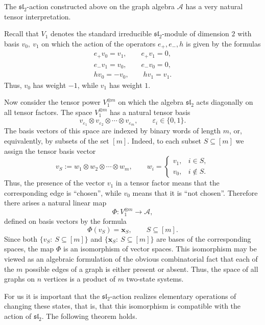 \documentclass[12pt,reqno]{amsart}
\begin{document}
The $\mathfrak{sl}_2$-action constructed above on the graph algebra
$\mathcal A$ has a very natural tensor interpretation.

Recall that $V_1$ denotes the standard irreducible $\mathfrak{sl}_2$-module
of dimension $2$ with basis
$
v_0,\ v_1
$
on which the action of the operators $e_+,e_-,h$ is given by the formulas
\begin{equation}\label{V1_action}
\begin{gathered}
e_+v_0=v_1,\qquad e_+v_1=0,\\
e_-v_1=v_0,\qquad e_-v_0=0,
\\
hv_0=-v_0,\qquad hv_1=v_1.
\end{gathered}
\end{equation}
Thus, $v_0$ has weight $-1$, while $v_1$ has weight $1$.

Now consider the tensor power
$
V_1^{\otimes m}
$
on which the algebra $\mathfrak{sl}_2$ acts diagonally on all tensor factors.
The space $V_1^{\otimes m}$ has a natural tensor basis
$$
v_{\varepsilon_1}\otimes v_{\varepsilon_2}\otimes\cdots\otimes v_{\varepsilon_m},
\qquad
\varepsilon_i\in\{0,1\}.
$$
The basis vectors of this space are indexed by binary words of length $m$,
or, equivalently, by subsets of the set $[m]$.
Indeed, to each subset $S\subseteq[m]$ we assign the tensor basis vector
\begin{equation}\label{ tensor_basis_S}
v_S:=w_1\otimes w_2\otimes\cdots\otimes w_m,
\qquad
w_i=
\begin{cases}
v_1,& i\in S,\\
v_0,& i\notin S.
\end{cases}
\end{equation}
Thus, the presence of the vector $v_1$ in a tensor factor means that the
corresponding edge is ``chosen'', while $v_0$ means that it is ``not chosen''.
Therefore there arises a natural linear map
$$
\Phi:V_1^{\otimes m}\longrightarrow \mathcal A,
$$
defined on basis vectors by the formula
$$
\Phi(v_S)=\boldsymbol{x}_S,
\qquad
S\subseteq[m].
$$
Since both $\{v_S:\ S\subseteq[m]\}$ and
$\{\boldsymbol{x}_S:\ S\subseteq[m]\}$ are bases of the corresponding
spaces, the map $\Phi$ is an isomorphism of vector spaces.
This isomorphism may be viewed as an algebraic formulation of the obvious
combinatorial fact that each of the $m$ possible edges of a graph is either
present or absent.
Thus, the space of all graphs on $n$ vertices is a product of $m$ two-state
systems.

For us it is important that the $\mathfrak{sl}_2$-action realizes elementary
operations of changing these states, that is, that this isomorphism is
compatible with the action of $\mathfrak{sl}_2$. The following theorem holds.
\end{document}
